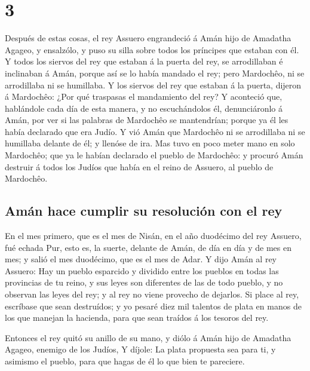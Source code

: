 \hypertarget{section-2}{%
\section{3}\label{section-2}}

 Después de estas cosas, el rey Assuero engrandeció á Amán
hijo de Amadatha Agageo, y ensalzólo, y puso su silla sobre todos los
príncipes que estaban con él.  Y todos los siervos del rey
que estaban á la puerta del rey, se arrodillaban é inclinaban á Amán,
porque así se lo había mandado el rey; pero Mardochêo, ni se arrodillaba
ni se humillaba.  Y los siervos del rey que estaban á la
puerta, dijeron á Mardochêo: ¿Por qué traspasas el mandamiento del rey?
 Y aconteció que, hablándole cada día de esta manera, y no
escuchándolos él, denunciáronlo á Amán, por ver si las palabras de
Mardochêo se mantendrían; porque ya él les había declarado que era
Judío.  Y vió Amán que Mardochêo ni se arrodillaba ni se
humillaba delante de él; y llenóse de ira.  Mas tuvo en
poco meter mano en solo Mardochêo; que ya le habían declarado el pueblo
de Mardochêo: y procuró Amán destruir á todos los Judíos que había en el
reino de Assuero, al pueblo de Mardochêo.

\hypertarget{amuxe1n-hace-cumplir-su-resoluciuxf3n-con-el-rey}{%
\subsection{Amán hace cumplir su resolución con el
rey}\label{amuxe1n-hace-cumplir-su-resoluciuxf3n-con-el-rey}}

 En el mes primero, que es el mes de Nisán, en el año
duodécimo del rey Assuero, fué echada Pur, esto es, la suerte, delante
de Amán, de día en día y de mes en mes; y salió el mes duodécimo, que es
el mes de Adar.  Y dijo Amán al rey Assuero: Hay un pueblo
esparcido y dividido entre los pueblos en todas las provincias de tu
reino, y sus leyes son diferentes de las de todo pueblo, y no observan
las leyes del rey; y al rey no viene provecho de dejarlos.
 Si place al rey, escríbase que sean destruídos; y yo
pesaré diez mil talentos de plata en manos de los que manejan la
hacienda, para que sean traídos á los tesoros del rey.

 Entonces el rey quitó su anillo de su mano, y diólo á
Amán hijo de Amadatha Agageo, enemigo de los Judíos,  Y
díjole: La plata propuesta sea para ti, y asimismo el pueblo, para que
hagas de él lo que bien te pareciere.

